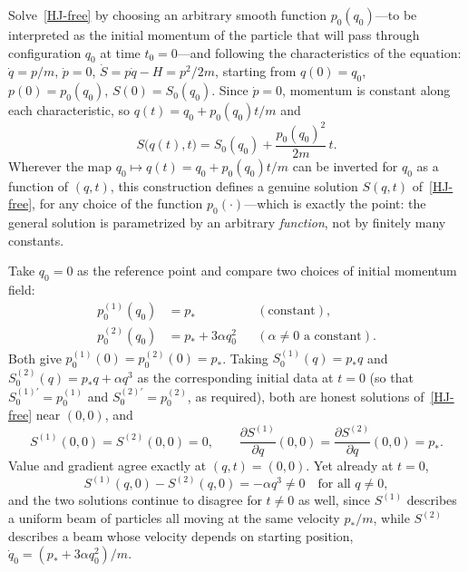 Solve~\eqref{HJ-free} by choosing an arbitrary smooth function $p_0(q_0)$---to
be interpreted as the initial momentum of the particle that will pass through
configuration $q_0$ at time $t_0=0$---and following the characteristics of the
equation: $\dot q = p/m$, $\dot p = 0$, $\dot S = p\dot q - H = p^2/2m$,
starting from $q(0)=q_0$, $p(0)=p_0(q_0)$, $S(0)=S_0(q_0)$. Since $\dot p=0$,
momentum is constant along each characteristic, so $q(t)=q_0+p_0(q_0)t/m$ and
\begin{equation}
S\big(q(t),t\big) = S_0(q_0) + \frac{p_0(q_0)^2}{2m}\,t .
\end{equation}
Wherever the map $q_0\mapsto q(t)=q_0+p_0(q_0)t/m$ can be inverted for $q_0$ as
a function of $(q,t)$, this construction defines a genuine solution $S(q,t)$
of~\eqref{HJ-free}, for any choice of the function $p_0(\cdot)$---which is
exactly the point: the general solution is parametrized by an arbitrary
\emph{function}, not by finitely many constants.

\begin{example}
\label{ex:free-particle}
Take $q_0=0$ as the reference point and compare two choices of initial momentum field:
\begin{align}
p_0^{(1)}(q_0) &= p_* & &(\text{constant}),\\
p_0^{(2)}(q_0) &= p_* + 3\alpha q_0^2 & &(\alpha\neq 0 \text{ a constant}).
\end{align}
Both give $p_0^{(1)}(0)=p_0^{(2)}(0)=p_*$. Taking $S_0^{(1)}(q)=p_* q$ and
    $S_0^{(2)}(q)=p_* q+\alpha q^3$ as the corresponding initial data at $t=0$
    (so that $S_0^{(1)\prime}=p_0^{(1)}$ and $S_0^{(2)\prime}=p_0^{(2)}$, as
    required), both are honest solutions of~\eqref{HJ-free} near $(0,0)$, and
\begin{equation}
S^{(1)}(0,0)=S^{(2)}(0,0)=0, \qquad \frac{\partial S^{(1)}}{\partial q}(0,0)=\frac{\partial S^{(2)}}{\partial q}(0,0)=p_* .
\end{equation}
Value and gradient agree exactly at $(q,t)=(0,0)$. Yet already at $t=0$,
\begin{equation}
S^{(1)}(q,0)-S^{(2)}(q,0) = -\alpha q^3 \neq 0 \quad \text{for all } q\neq 0 ,
\end{equation}
and the two solutions continue to disagree for $t\neq0$ as well, since
    $S^{(1)}$ describes a uniform beam of particles all moving at the same
    velocity $p_*/m$, while $S^{(2)}$ describes a beam whose velocity depends
    on starting position, $\dot q_0=(p_*+3\alpha q_0^2)/m$.
\end{example}

